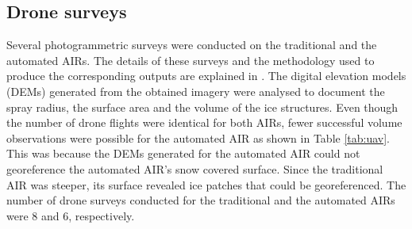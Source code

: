 \documentclass[tc, manuscript]{copernicus}
\begin{document}
\subsection{Drone surveys}

Several photogrammetric surveys were conducted on the traditional and the automated AIRs. The details of these
surveys and the methodology used to produce the corresponding outputs are explained in
\cite{balasubramanianInfluenceMeteorologicalConditions2022}. The digital elevation models (DEMs) generated from
the obtained imagery were analysed to document the spray radius, the surface area and the volume of the ice
structures. Even though the number of drone flights were identical for both AIRs, fewer successful volume
observations were possible for the automated AIR as shown in Table \ref{tab:uav}. This was because the DEMs
generated for the automated AIR could not georeference the automated AIR's snow covered surface. Since the
traditional AIR was steeper, its surface revealed ice patches that could be georeferenced. The number of drone
surveys conducted for the traditional and the automated AIRs were 8 and 6, respectively. 
\end{document}
